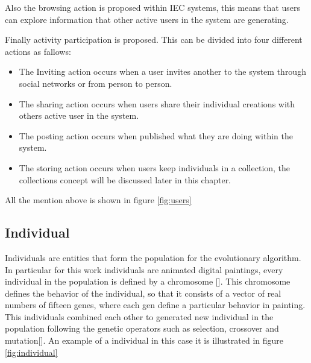 \documentclass[conference]{IEEEtran}
\begin{document}
Also the  browsing action is proposed within IEC systems,  this means that users
can explore information that other active users in the system are generating.

Finally activity participation is proposed. This can be divided into four
different actions as fallows:

\begin{itemize} 
\item The Inviting action occurs when a user invites another to the system through social networks or from person to person.  
\item The sharing action occurs when users share their individual creations with others active user in the system.
\item The posting action occurs when published what they are doing within the system.
\item The storing action occurs when users keep individuals in a collection, the collections concept will be discussed later in this chapter.
\end{itemize}

All the mention above is shown in figure \ref{fig:users}

\subsection{Individual}  

Individuals are entities that form the population for the evolutionary
algorithm. In particular for  this work individuals are animated digital
paintings, every individual in the population is defined by a chromosome [].
This chromosome defines the behavior of the individual, so that it consists of a
vector of real numbers of fifteen genes, where each gen define a particular
behavior in painting. This individuals combined each other to generated new
individual in the population following the genetic operators such as selection,
crossover and mutation[]. An example of a individual in this case it is
illustrated in figure \ref{fig:individual}
\end{document}
